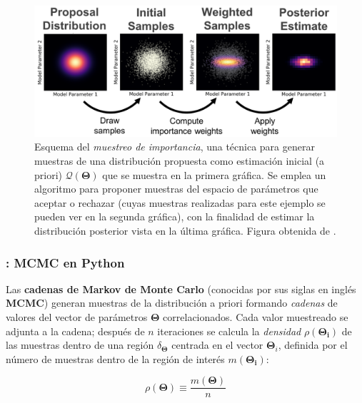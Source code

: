 \begin{figure}[!ht]
	\centering
	\includegraphics[scale=0.28]{Introduccion/Figures/Figura MCMC Pesos Muestreo.png}
	\caption{Esquema del \textit{muestreo de importancia}, una técnica para
	generar muestras de una distribución propuesta como estimación inicial (a
	priori) $\mathcal{Q}(\mathbf{\Theta})$ que se muestra en la primera gráfica.
	Se emplea un algoritmo para proponer muestras del espacio de parámetros que
	aceptar o rechazar (cuyas muestras realizadas para este ejemplo se pueden
	ver en la segunda gráfica), con la finalidad de estimar la distribución
	posterior vista en la última gráfica. Figura obtenida de
	.}
	\label{figuraMcmcMuestreoImportancia}
\end{figure}

\subsubsection{: MCMC en Python} \label{intro:phoebe:problema_inverso:muestreo:emcee}

Las \textbf{cadenas de Markov de Monte Carlo} (conocidas por sus siglas en
inglés \textbf{MCMC}) generan muestras de la distribución a priori formando
\textit{cadenas} de valores del vector de parámetros $\mathbf{\Theta}$
correlacionados. Cada valor muestreado se adjunta a la cadena; después de $n$
iteraciones se calcula la \textit{densidad} $\rho(\mathbf{\Theta_i})$ de las
muestras dentro de una región $\delta_{\mathbf{\Theta}}$ centrada en el vector
$\mathbf{\Theta}_i$, definida por el número de muestras dentro de la región de
interés $m(\mathbf{\Theta_i})$:

\begin{eqfloat}[!ht]
	\centering
	\begin{equation}
		\rho(\mathbf{\Theta}) \equiv \frac{m(\mathbf{\Theta})}{n}
	\end{equation}
\end{eqfloat}


